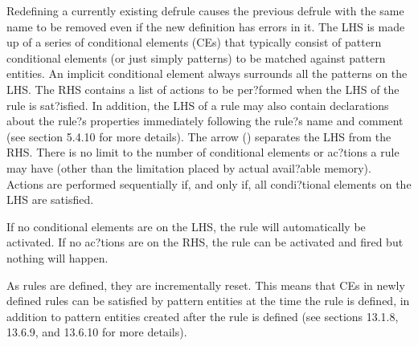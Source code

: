 \documentclass[letterpaper,10pt,english]{sphinxmanual}
\begin{document}

\begin{sphinxVerbatim}[commandchars=\\\{\}]
  \PYG{p}{[}\PYG{p}{]} \PYG{p}{[}\PYG{p}{]}   
             
         
         
\end{sphinxVerbatim}

Redefining a currently existing defrule causes the previous defrule with
the same name to be removed even if the new definition has errors in it.
The LHS is made up of a series of conditional elements (CEs) that
typically consist of pattern conditional elements (or just simply
patterns) to be matched against pattern entities. An implicit 
conditional element always surrounds all the patterns on the LHS. The
RHS contains a list of actions to be per?formed when the LHS of the rule
is sat?isfied. In addition, the LHS of a rule may also contain
declarations about the rule?s properties immediately following the
rule?s name and comment (see section 5.4.10 for more details). The arrow
(\sphinxstylestrong{=\textgreater{}}) separates the LHS from the RHS. There is no limit to the number
of conditional elements or ac?tions a rule may have (other than the
limitation placed by actual avail?able memory). Actions are performed
sequentially if, and only if, all condi?tional elements on the LHS are
satisfied.

If no conditional elements are on the LHS, the rule will automatically
be activated. If no ac?tions are on the RHS, the rule can be activated
and fired but nothing will happen.

As rules are defined, they are incrementally reset. This means that CEs
in newly defined rules can be satisfied by pattern entities at the time
the rule is defined, in addition to pattern entities created after the
rule is defined (see sections 13.1.8, 13.6.9, and 13.6.10 for more
details).
\end{document}

